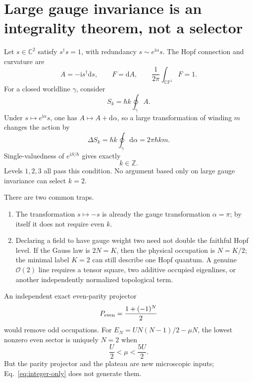 \documentclass[11pt]{article}
\theoremstyle{definition}
\theoremstyle{remark}
\newcommand{\CP}{\mathbb{CP}}
\newcommand{\CC}{\mathbb{C}}
\newcommand{\cO}{\mathcal O}
\newcommand{\ii}{\mathrm i}
\newcommand{\dd}{\mathrm d}
\begin{document}
\section{Large gauge invariance is an integrality theorem, not a selector}

Let \(s\in\CC^2\) satisfy \(s^\dagger s=1\), with redundancy
\(s\sim e^{\ii\alpha}s\).  The Hopf connection and curvature are
\begin{equation}
 A=-\ii s^\dagger\dd s,\qquad F=\dd A,\qquad
 \frac1{2\pi}\int_{\CP^1}F=1.
 \label{eq:hopf-data}
\end{equation}
For a closed worldline \(\gamma\), consider
\begin{equation}
 S_k=\hbar k\oint_\gamma A.
 \label{eq:level-action}
\end{equation}
Under \(s\mapsto e^{\ii\alpha}s\), one has \(A\mapsto A+\dd\alpha\), so a
large transformation of winding \(m\) changes the action by
\begin{equation}
 \Delta S_k=\hbar k\oint_\gamma\dd\alpha=2\pi\hbar k m.
\end{equation}
Single-valuedness of \(e^{\ii S/\hbar}\) gives exactly
\begin{equation}
 \boxed{k\in\mathbb Z.}
 \label{eq:integer-only}
\end{equation}
Levels \(1,2,3\) all pass this condition.  No argument based only on large
gauge invariance can select \(k=2\).

There are two common traps.
\begin{enumerate}
\item The transformation \(s\mapsto-s\) is already the gauge transformation
  \(\alpha=\pi\); by itself it does not require even \(k\).
\item Declaring a field to have gauge weight two need not double the faithful
  Hopf level.  If the Gauss law is \(2N=K\), then the physical occupation is
  \(N=K/2\); the minimal label \(K=2\) can still describe one Hopf quantum.
  A genuine \(\cO(2)\) line requires a tensor square, two additive occupied
  eigenlines, or another independently normalized topological term.
\end{enumerate}

An independent exact even-parity projector
\begin{equation}
 P_{\rm even}=\frac{1+(-1)^N}{2}
\end{equation}
would remove odd occupations.  For
\(E_N=UN(N-1)/2-\mu N\), the lowest nonzero even sector is uniquely \(N=2\)
when
\begin{equation}
 \frac U2<\mu<\frac{5U}{2}.
 \label{eq:even-window}
\end{equation}
But the parity projector and the plateau are new microscopic inputs;
Eq.~\eqref{eq:integer-only} does not generate them.
\end{document}

